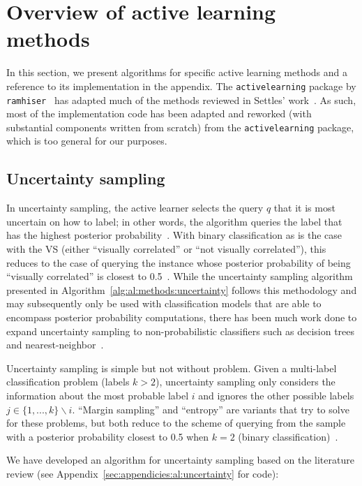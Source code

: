 \section{Overview of active learning methods}
\label{sec:al:methods}

In this section, we present algorithms for specific active learning methods and 
a reference to its implementation in the appendix. The 
\texttt{activelearning} package by \texttt{ramhiser}~\cite{ramhiser2015} has 
adapted much of the methods reviewed in Settles' work~\cite{settles2010}. As 
such, most of the implementation code has been adapted and reworked (with 
substantial components written from scratch) from the 
\texttt{activelearning} package, which is too general for our purposes.

\subsection{Uncertainty sampling}
\label{sec:al:methods:uncertainty} 

In uncertainty sampling, the active learner selects the query $q$ that it is 
most uncertain on how to label; in other words, the algorithm queries the label 
that has the highest posterior probability~\cite{lewis1994}. With binary 
classification as is the case with the VS (either ``visually correlated'' or 
``not visually correlated''), this reduces to the case of querying the instance 
whose posterior probability of being ``visually correlated'' is closest to 
0.5~\cite{lewis1994}. While the uncertainty sampling algorithm presented in 
Algorithm~\ref{alg:al:methods:uncertainty} follows this 
methodology and may subsequently only be used with classification models that 
are able to encompass posterior probability computations, there has been much 
work done to expand uncertainty sampling to non-probabilistic classifiers such 
as decision trees and nearest-neighbor~\cite{settles2010}.

Uncertainty sampling is simple but not without problem. Given a multi-label 
classification problem (labels $k > 2$), uncertainty sampling only 
considers the information about the most probable label $i$ and ignores the 
other possible labels $j \in \{1,...,k\}\backslash i$. ``Margin sampling'' and 
``entropy'' are variants that try to solve for these problems, but 
both reduce to the scheme of querying from the sample with a posterior 
probability closest to 0.5 when $k=2$ (binary 
classification)~\cite{settles2010}.

We have developed an algorithm for uncertainty sampling based on the literature 
review (see Appendix~\ref{sec:appendicies:al:uncertainty} for code):

